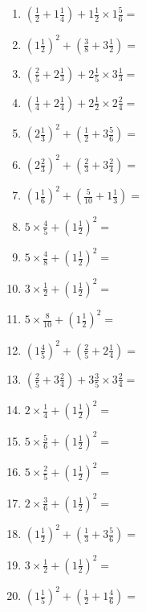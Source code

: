 \documentclass[12pt]{article}
\begin{document}
\begin{enumerate}
\newpage
\item \large $ (\frac{1}{2} + 1 \frac{1}{4}) + 1 \frac{1}{2} \times 1 \frac{5}{6} = $ \vspace{1.8cm}
\item \large $ (1 \frac{1}{2})^2 + (\frac{3}{8} + 3 \frac{1}{2}) = $ \vspace{1.8cm}
\item \large $ (\frac{2}{5} + 2 \frac{1}{3}) + 2 \frac{1}{5} \times 3 \frac{1}{3} = $ \vspace{1.8cm}
\item \large $ (\frac{1}{4} + 2 \frac{1}{4}) + 2 \frac{1}{2} \times 2 \frac{2}{4} = $ \vspace{1.8cm}
\item \large $ (2 \frac{1}{3})^2 + (\frac{1}{2} + 3 \frac{5}{6}) = $ \vspace{1.8cm}
\item \large $ (2 \frac{2}{3})^2 + (\frac{2}{3} + 3 \frac{2}{4}) = $ \vspace{1.8cm}
\item \large $ (1 \frac{1}{6})^2 + (\frac{5}{10} + 1 \frac{1}{3}) = $ \vspace{1.8cm}
\item \large $ 5 \times \frac{4}{5} + (1 \frac{1}{2})^2 = $ \vspace{1.8cm}
\item \large $ 5 \times \frac{4}{8} + (1 \frac{1}{2})^2 = $ \vspace{1.8cm}
\item \large $ 3 \times \frac{1}{2} + (1 \frac{1}{2})^2 = $ \vspace{1.8cm}
\newpage
\item \large $ 5 \times \frac{8}{10} + (1 \frac{1}{2})^2 = $ \vspace{1.8cm}
\item \large $ (1 \frac{4}{5})^2 + (\frac{2}{5} + 2 \frac{1}{4}) = $ \vspace{1.8cm}
\item \large $ (\frac{2}{5} + 3 \frac{2}{4}) + 3 \frac{3}{5} \times 3 \frac{2}{4} = $ \vspace{1.8cm}
\item \large $ 2 \times \frac{1}{4} + (1 \frac{1}{2})^2 = $ \vspace{1.8cm}
\item \large $ 5 \times \frac{5}{6} + (1 \frac{1}{2})^2 = $ \vspace{1.8cm}
\item \large $ 5 \times \frac{2}{5} + (1 \frac{1}{2})^2 = $ \vspace{1.8cm}
\item \large $ 2 \times \frac{3}{6} + (1 \frac{1}{2})^2 = $ \vspace{1.8cm}
\item \large $ (1 \frac{1}{2})^2 + (\frac{1}{3} + 3 \frac{5}{6}) = $ \vspace{1.8cm}
\item \large $ 3 \times \frac{1}{2} + (1 \frac{1}{2})^2 = $ \vspace{1.8cm}
\item \large $ (1 \frac{1}{5})^2 + (\frac{1}{2} + 1 \frac{4}{6}) = $ \vspace{1.8cm}
\end{enumerate}\newpage
\end{document}
